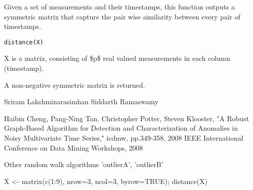 \begin{Description}\relax
Given a set of measurements and their timestamps, this function outputs a symmetric matrix that capture the pair wise similarity between every pair of timestamps.
\end{Description}
\begin{Usage}
\begin{verbatim}
distance(X)
\end{verbatim}
\end{Usage}
\begin{Arguments}
\begin{ldescription}
\item[\code{X}] X is a matrix, consisting of \$p\$ real valued measurements in each column (timestamp).

\end{ldescription}
\end{Arguments}
\begin{Value}
A non-negative symmetric matrix is returned.
\end{Value}
\begin{Author}\relax
Sriram Lakshminarasimhan        
Siddarth Ramaswamy
\end{Author}
\begin{References}\relax
Haibin Cheng, Pang-Ning Tan, Christopher Potter, Steven Klooster, "A Robust Graph-Based Algorithm for Detection and Characterization of Anomalies in Noisy Multivariate Time Series," icdmw, pp.349-358, 2008 IEEE International Conference on Data Mining Workshops, 2008
\end{References}
\begin{SeeAlso}\relax
Other random walk algorithms 'outlierA', 'outlierB'
\end{SeeAlso}
\begin{Examples}
\begin{ExampleCode}
X <- matrix(c(1:9), nrow=3, ncol=3, byrow=TRUE);
distance(X)
\end{ExampleCode}
\end{Examples}

